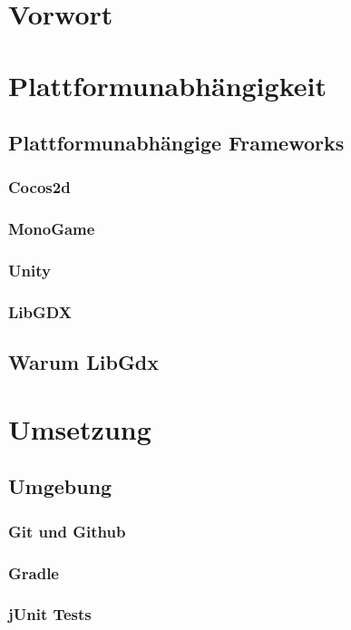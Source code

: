 \section{Vorwort}
\section{Plattformunabhängigkeit}
	\subsection{Plattformunabhängige Frameworks}
		\subsubsection{Cocos2d}
		\subsubsection{MonoGame}
		\subsubsection{Unity}
		\subsubsection{LibGDX}
	\subsection{Warum LibGdx}
\section{Umsetzung}
	\subsection{Umgebung}
		\subsubsection{Git und Github}
		\subsubsection{Gradle}
		\subsubsection{jUnit Tests}
